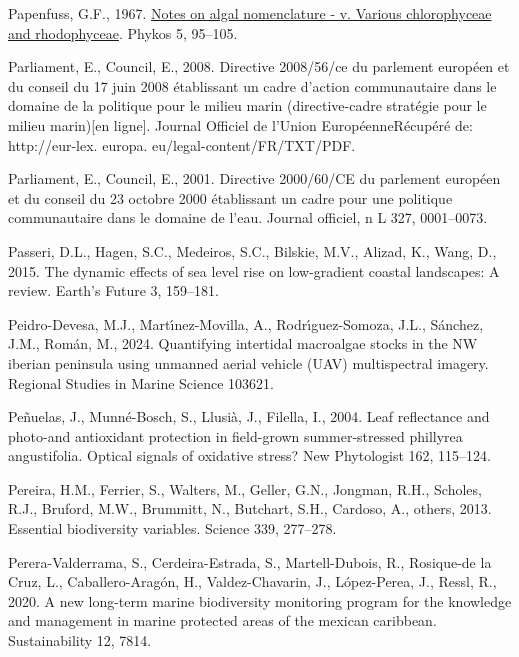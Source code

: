 \documentclass[
  letterpaper,
  11pt,
  english,
  singlespacing,
  headsepline]{MastersDoctoralThesis}
\newlength{\cslhangindent}
\newenvironment{CSLReferences}[2] %
 {\begin{list}{}{%
  \setlength{\itemindent}{0pt}
  \setlength{\leftmargin}{0pt}
  \setlength{\parsep}{0pt}
  \ifodd #1
   \setlength{\leftmargin}{\cslhangindent}
   \setlength{\itemindent}{-1\cslhangindent}
  \fi
  \setlength{\itemsep}{#2\baselineskip}}}
 {\end{list}}
\begin{document}
\begin{CSLReferences}{1}{0}
Papenfuss, G.F., 1967.
\href{https://marinespecies.org/aphia.php?p\%20=\%20sourcedetails&id\%20=\%20303450}{Notes
on algal nomenclature - v. Various chlorophyceae and rhodophyceae}.
Phykos 5, 95--105.

Parliament, E., Council, E., 2008. Directive 2008/56/ce du parlement
europ{é}en et du conseil du 17 juin 2008 {é}tablissant un cadre d'action
communautaire dans le domaine de la politique pour le milieu marin
(directive-cadre {\guillemotleft}strat{é}gie pour le milieu
marin{\guillemotright}){[}en ligne{]}. Journal Officiel de l'Union
Europ{é}enneR{é}cup{é}r{é} de: http://eur-lex. europa.
eu/legal-content/FR/TXT/PDF.

Parliament, E., Council, E., 2001. Directive 2000/60/CE du parlement
europ{é}en et du conseil du 23 octobre 2000 {é}tablissant un cadre pour
une politique communautaire dans le domaine de l'eau. Journal officiel,
n L 327, 0001--0073.

Passeri, D.L., Hagen, S.C., Medeiros, S.C., Bilskie, M.V., Alizad, K.,
Wang, D., 2015. The dynamic effects of sea level rise on low-gradient
coastal landscapes: A review. Earth's Future 3, 159--181.

Peidro-Devesa, M.J., Martı́nez-Movilla, A., Rodrı́guez-Somoza, J.L.,
Sánchez, J.M., Román, M., 2024. Quantifying intertidal macroalgae stocks
in the NW iberian peninsula using unmanned aerial vehicle (UAV)
multispectral imagery. Regional Studies in Marine Science 103621.

Peñuelas, J., Munné-Bosch, S., Llusià, J., Filella, I., 2004. Leaf
reflectance and photo-and antioxidant protection in field-grown
summer-stressed phillyrea angustifolia. Optical signals of oxidative
stress? New Phytologist 162, 115--124.

Pereira, H.M., Ferrier, S., Walters, M., Geller, G.N., Jongman, R.H.,
Scholes, R.J., Bruford, M.W., Brummitt, N., Butchart, S.H., Cardoso, A.,
others, 2013. Essential biodiversity variables. Science 339, 277--278.

Perera-Valderrama, S., Cerdeira-Estrada, S., Martell-Dubois, R.,
Rosique-de la Cruz, L., Caballero-Aragón, H., Valdez-Chavarin, J.,
López-Perea, J., Ressl, R., 2020. A new long-term marine biodiversity
monitoring program for the knowledge and management in marine protected
areas of the mexican caribbean. Sustainability 12, 7814.


\end{CSLReferences}
\end{document}
